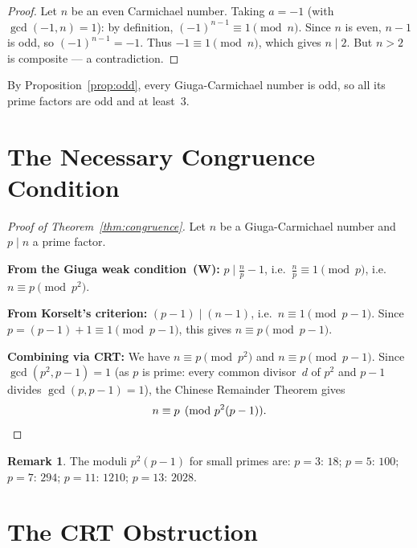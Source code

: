 \documentclass[12pt,a4paper]{amsart}
\theoremstyle{definition}
\newtheorem{remark}[theorem]{Remark}
\begin{document}
\begin{proof}
Let $n$ be an even Carmichael number.  Taking $a = -1$ (with $\gcd(-1, n) = 1$):
by definition, $(-1)^{n-1} \equiv 1 \pmod{n}$.  Since $n$ is even, $n - 1$
is odd, so $(-1)^{n-1} = -1$.  Thus $-1 \equiv 1 \pmod{n}$, which gives
$n \mid 2$.  But $n > 2$ is composite — a contradiction.
\end{proof}

By Proposition~\ref{prop:odd}, every Giuga-Carmichael number is odd, so all
its prime factors are odd and at least~$3$.

\section{The Necessary Congruence Condition}
\label{sec:congruence}

\begin{proof}[Proof of Theorem~\ref{thm:congruence}]
Let $n$ be a Giuga-Carmichael number and $p \mid n$ a prime factor.

\medskip
\noindent\textbf{From the Giuga weak condition~(W):}
$p \mid \tfrac{n}{p} - 1$, i.e.\ $\tfrac{n}{p} \equiv 1 \pmod{p}$,
i.e.\ $n \equiv p \pmod{p^2}$.

\medskip
\noindent\textbf{From Korselt's criterion:}
$(p-1) \mid (n-1)$, i.e.\ $n \equiv 1 \pmod{p-1}$.
Since $p = (p-1) + 1 \equiv 1 \pmod{p-1}$, this gives $n \equiv p \pmod{p-1}$.

\medskip
\noindent\textbf{Combining via CRT:}
We have $n \equiv p \pmod{p^2}$ and $n \equiv p \pmod{p-1}$.
Since $\gcd(p^2, p-1) = 1$ (as $p$ is prime: every common divisor~$d$
of $p^2$ and $p-1$ divides $\gcd(p, p-1) = 1$),
the Chinese Remainder Theorem gives
\[
  n \equiv p \pmod{p^2(p-1)}.  \qedhere
\]
\end{proof}

\begin{remark}
The moduli $p^2(p-1)$ for small primes are:
$p=3$: $18$; $p=5$: $100$; $p=7$: $294$; $p=11$: $1210$; $p=13$: $2028$.
\end{remark}

\section{The CRT Obstruction}
\label{sec:crt}
\end{document}
